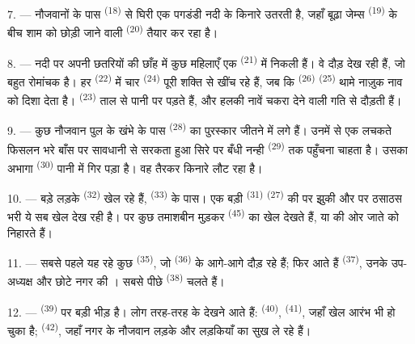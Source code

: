 7. --- नौजवानों के पास  \textsuperscript{(18)} से घिरी एक पगडंडी
नदी के किनारे उतरती है, जहाँ बूढ़ा जेम्स  \textsuperscript{(19)}
के बीच शाम को छोड़ी जाने वाली  \textsuperscript{(20)} तैयार कर
रहा है।

\VUsaut{4.4mm}
\VUsaut{3.4mm}

8. --- नदी पर अपनी छतरियों की छाँह में कुछ महिलाएँ एक 
\textsuperscript{(21)} में निकली हैं। वे दौड़ देख रही हैं, जो बहुत रोमांचक है। हर
 \textsuperscript{(22)} में चार  \textsuperscript{(24)}
पूरी शक्ति से खींच रहे हैं, जब कि  \textsuperscript{(26)}
 \textsuperscript{(25)} थामे नाज़ुक नाव को दिशा देता है।
 \textsuperscript{(23)} ताल से पानी पर पड़ते हैं, और हलकी नावें
चकरा देने वाली गति से दौड़ती हैं।

9. --- कुछ नौजवान पुल के खंभे के पास  \textsuperscript{(28)}
का पुरस्कार जीतने में लगे हैं। उनमें से एक लचकते फिसलन भरे बाँस पर सावधानी से
सरकता हुआ सिरे पर बँधी नन्ही  \textsuperscript{(29)} तक पहुँचना चाहता
है। उसका अभागा  \textsuperscript{(30)} पानी में गिर पड़ा है।
वह तैरकर किनारे लौट रहा है।

10. --- बड़े लड़के  \textsuperscript{(32)} खेल रहे हैं,
 \textsuperscript{(33)} के पास। एक बड़ी 
\textsuperscript{(31)}  \textsuperscript{(27)} की  पर
झुकी और  पर ठसाठस भरी ये सब खेल देख रही है। पर कुछ तमाशबीन मुड़कर
 \textsuperscript{(45)} का खेल देखते हैं, या
 की ओर जाते  को निहारते हैं।

11. --- सबसे पहले यह रहे कुछ  \textsuperscript{(35)}, जो
 \textsuperscript{(36)} के आगे-आगे दौड़ रहे हैं; फिर आते हैं
 \textsuperscript{(37)}, उनके उप-अध्यक्ष और छोटे नगर की
। सबसे पीछे  \textsuperscript{(38)} चलते हैं।

\VUsaut{5.0mm}
\VUsaut{3.6mm}

12. ---  \textsuperscript{(39)} पर बड़ी भीड़ है। लोग
तरह-तरह के  देखने आते हैं: 
\textsuperscript{(40)},  \textsuperscript{(41)}, जहाँ खेल आरंभ भी हो
चुका है;  \textsuperscript{(42)}, जहाँ नगर के नौजवान लड़के
और लड़कियाँ  का सुख ले रहे हैं।

